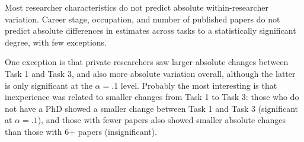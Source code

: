 \documentclass[
  letterpaper,
  DIV=11,
  numbers=noendperiod]{scrartcl}
\begin{document}
Most researcher characteristics do not predict absolute
within-researcher variation. Career stage, occupation, and number of
published papers do not predict absolute differences in estimates across
tasks to a statistically significant degree, with few exceptions.

One exception is that private researchers saw larger absolute changes
between Task 1 and Task 3, and also more absolute variation overall,
although the latter is only significant at the \(\alpha = .1\) level.
Probably the most interesting is that inexperience was related to
smaller changes from Task 1 to Task 3: those who do not have a PhD
showed a smaller change between Task 1 and Task 3 (significant at
\(\alpha = .1\)), and those with fewer papers also showed smaller
absolute changes than those with 6+ papers (insignificant).
\end{document}
